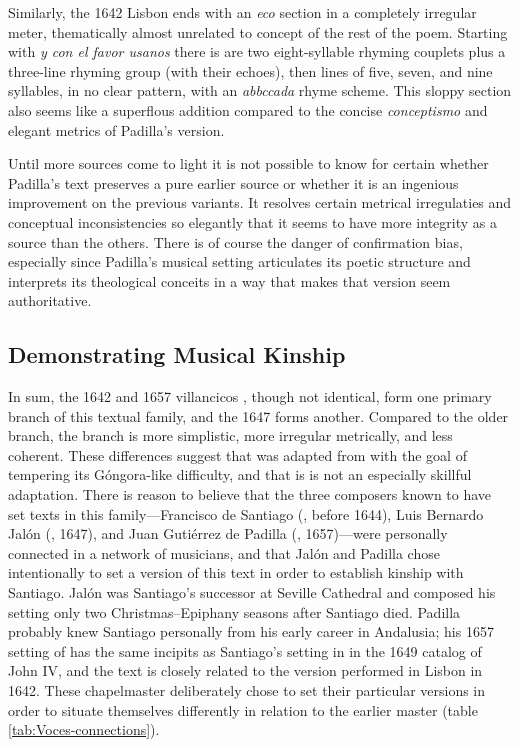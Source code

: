 Similarly, the 1642 Lisbon  ends with an \emph{eco} section in a completely
irregular meter, thematically almost unrelated to concept of the rest of the
poem.
Starting with \emph{y con el favor usanos} there is are two eight-syllable rhyming
couplets plus a three-line rhyming group (with their echoes), then lines of
five, seven, and nine syllables, in no clear pattern, with an \emph{abbccada} rhyme
scheme.
This sloppy section also seems like a superflous addition compared to the
concise \emph{conceptismo} and elegant metrics of Padilla's version.

Until more sources come to light it is not possible to know for certain whether
Padilla's text preserves a pure earlier source or whether it is an
ingenious improvement on the previous variants.
It resolves certain metrical irregulaties and conceptual inconsistencies so
elegantly that it seems to have more integrity as a source than the others.
There is of course the danger of confirmation bias, especially since Padilla's
musical setting articulates its poetic structure and interprets its theological
conceits in a way that makes that version seem authoritative.

\subsection{Demonstrating Musical Kinship}

In sum, the 1642 and 1657 villancicos , though not
identical, form one primary branch of this textual family, and the 1647
 forms another.
Compared to the older  branch, the  branch is more simplistic,
more irregular metrically, and less coherent.
These differences suggest that  was adapted from  with the goal
of tempering its Góngora-like difficulty, and that is is not an especially
skillful adaptation.
There is reason to believe that the three composers known to have set texts in
this family---Francisco de Santiago (, before 1644), Luis Bernardo Jalón
(, 1647), and Juan Gutiérrez de Padilla (, 1657)---were
personally connected in a network of musicians, and that Jalón and Padilla chose
intentionally to set a version of this text in order to establish kinship with
Santiago.
Jalón was Santiago's successor at Seville Cathedral and composed his 
setting only two Christmas--Epiphany seasons after Santiago died.
Padilla probably knew Santiago personally from his early career in Andalusia;
his 1657 setting of  has the same incipits as Santiago's
setting in in the 1649 catalog of John IV, and the text is closely related to
the version performed in Lisbon in 1642.
These chapelmaster deliberately chose to set their particular versions in order
to situate themselves differently in relation to the earlier master (table
\ref{tab:Voces-connections}).

